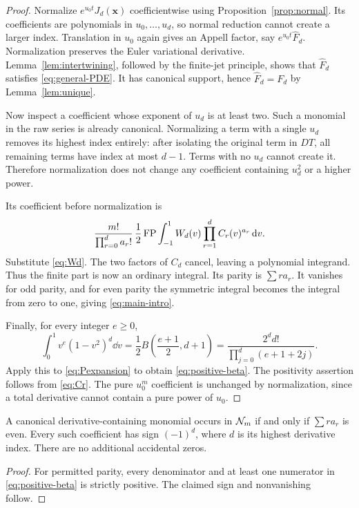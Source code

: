 \begin{proof}
Normalize $e^{u_0t}J_d(\boldsymbol x)$ coefficientwise using Proposition~\ref{prop:normal}. Its coefficients are polynomials in $u_0,\ldots,u_d$, so normal reduction cannot create a larger index. Translation in $u_0$ again gives an Appell factor, say $e^{u_0t}\widehat F_d$. Normalization preserves the Euler variational derivative. Lemma~\ref{lem:intertwining}, followed by the finite-jet principle, shows that $\widehat F_d$ satisfies \eqref{eq:general-PDE}. It has canonical support, hence $\widehat F_d=F_d$ by Lemma~\ref{lem:unique}.

Now inspect a coefficient whose exponent of $u_d$ is at least two. Such a monomial in the raw series is already canonical. Normalizing a term with a single $u_d$ removes its highest index entirely: after isolating the original term in $DT$, all remaining terms have index at most $d-1$. Terms with no $u_d$ cannot create it. Therefore normalization does not change any coefficient containing $u_d^2$ or a higher power.

Its coefficient before normalization is
\[
 \frac{m!}{\prod_{r=0}^d a_r!}\,
 \frac12\operatorname{FP}\int_{-1}^1W_d(v)\prod_{r=1}^dC_r(v)^{a_r}\,\mathrm d v.
\]
Substitute \eqref{eq:Wd}. The two factors of $C_d$ cancel, leaving a polynomial integrand. Thus the finite part is now an ordinary integral. Its parity is $\sum r a_r$. It vanishes for odd parity, and for even parity the symmetric integral becomes the integral from zero to one, giving \eqref{eq:main-intro}.

Finally, for every integer $e\ge0$,
\begin{equation}\label{eq:beta-elementary}
 \int_0^1v^e(1-v^2)^d\dd v
 =\frac12 B\left(\frac{e+1}{2},d+1\right)
 =\frac{2^d d!}{\prod_{j=0}^d(e+1+2j)}.
\end{equation}
Apply this to \eqref{eq:Pexpansion} to obtain \eqref{eq:positive-beta}. The positivity assertion follows from \eqref{eq:Cr}. The pure $u_0^m$ coefficient is unchanged by normalization, since a total derivative cannot contain a pure power of $u_0$.
\end{proof}

\begin{corollary}\label{cor:sign}
A canonical derivative-containing monomial occurs in $\mathcal N_m$ if and only if $\sum r a_r$ is even. Every such coefficient has sign $(-1)^d$, where $d$ is its highest derivative index. There are no additional accidental zeros.
\end{corollary}
\begin{proof}
For permitted parity, every denominator and at least one numerator in \eqref{eq:positive-beta} is strictly positive. The claimed sign and nonvanishing follow.
\end{proof}

